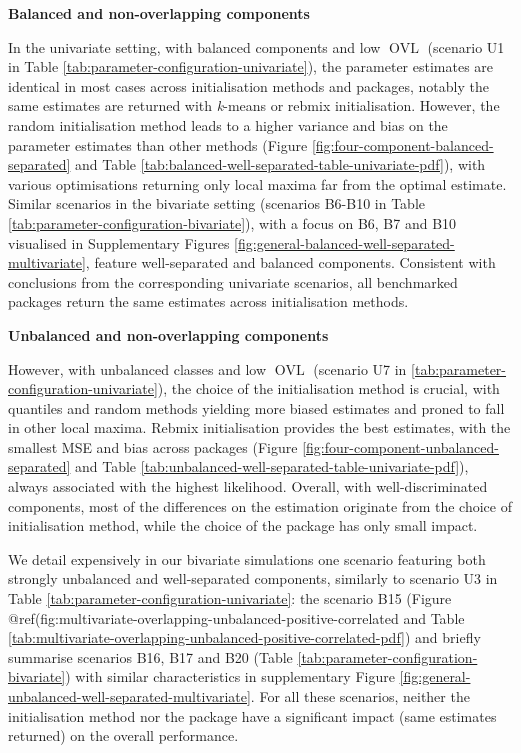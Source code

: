 \textbf{Balanced and non-overlapping components}

In the univariate setting, with balanced components and low \(\operatorname{OVL}\) (scenario U1 in Table
\ref{tab:parameter-configuration-univariate}), the parameter
estimates are identical in most cases across initialisation methods and packages, notably the same estimates are returned with \emph{k}-means or rebmix initialisation. However, the random initialisation method leads
to a higher variance and bias on the parameter estimates than other
methods (Figure \ref{fig:four-component-balanced-separated} and Table
\ref{tab:balanced-well-separated-table-univariate-pdf}),
with various optimisations returning only local maxima far from the
optimal estimate.
Similar scenarios in the bivariate setting (scenarios B6-B10 in Table \ref{tab:parameter-configuration-bivariate}), with a focus on B6, B7 and B10 visualised in Supplementary Figures \ref{fig:general-balanced-well-separated-multivariate}, feature well-separated and balanced components. Consistent with conclusions from the corresponding univariate scenarios, all benchmarked packages return the same estimates across initialisation methods.

\textbf{Unbalanced and non-overlapping components}

However, with unbalanced classes and low \(\operatorname{OVL}\) (scenario U7 in
\ref{tab:parameter-configuration-univariate}), the choice of the
initialisation method is crucial, with quantiles and random
methods yielding more biased estimates and proned to fall in other local
maxima. Rebmix initialisation provides the best estimates, with the
smallest MSE and bias across packages (Figure
\ref{fig:four-component-unbalanced-separated} and Table
\ref{tab:unbalanced-well-separated-table-univariate-pdf}),
always associated with the highest likelihood. Overall, with
well-discriminated components, most of the differences on the estimation
originate from the choice of initialisation method, while the choice of
the package has only small impact.

We detail expensively in our bivariate simulations one scenario featuring both strongly unbalanced and well-separated components, similarly to scenario U3 in Table \ref{tab:parameter-configuration-univariate}: the scenario B15 (Figure @ref(fig:multivariate-overlapping-unbalanced-positive-correlated and Table \ref{tab:multivariate-overlapping-unbalanced-positive-correlated-pdf}) and briefly summarise scenarios B16, B17 and B20 (Table \ref{tab:parameter-configuration-bivariate}) with similar characteristics in supplementary Figure \ref{fig:general-unbalanced-well-separated-multivariate}. For all these scenarios, neither the initialisation method nor the package have a significant impact (same estimates returned) on the overall performance.

